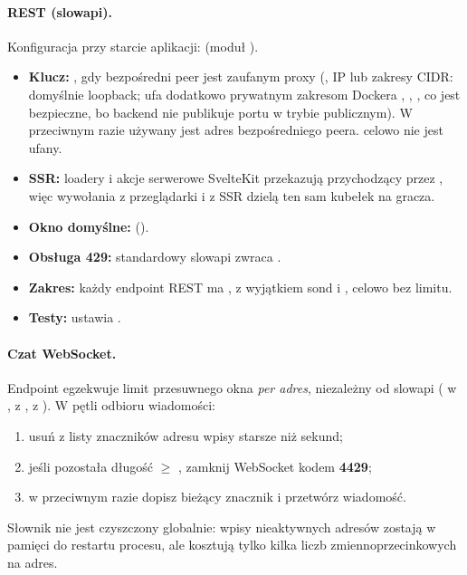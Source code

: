 \paragraph{REST (slowapi).} Konfiguracja przy starcie aplikacji:
 (moduł ).
\begin{itemize}
  \item \textbf{Klucz:} , gdy bezpośredni peer jest zaufanym proxy
        (, IP lub zakresy CIDR: domyślnie loopback;
         ufa dodatkowo prywatnym zakresom Dockera
        , , , co jest bezpieczne,
        bo backend nie publikuje portu w trybie publicznym). W przeciwnym razie używany
        jest adres bezpośredniego peera.  celowo nie jest ufany.
  \item \textbf{SSR:} loadery i akcje serwerowe SvelteKit przekazują przychodzący
         przez , więc wywołania z przeglądarki i
        z SSR dzielą ten sam kubełek na gracza.
  \item \textbf{Okno domyślne:}  ().
  \item \textbf{Obsługa 429:} standardowy  slowapi
        zwraca .
  \item \textbf{Zakres:} każdy endpoint REST ma ,
        z wyjątkiem sond  i , celowo bez limitu.
  \item \textbf{Testy:}  ustawia .
\end{itemize}

\paragraph{Czat WebSocket.} Endpoint  egzekwuje limit
przesuwnego okna \emph{per adres}, niezależny od slowapi ( w
,  z ,  z
). W pętli odbioru wiadomości:
\begin{enumerate}
  \item usuń z listy znaczników adresu wpisy starsze niż  sekund;
  \item jeśli pozostała długość $\geq$ , zamknij WebSocket kodem \textbf{4429};
  \item w przeciwnym razie dopisz bieżący znacznik i przetwórz wiadomość.
\end{enumerate}
Słownik  nie jest czyszczony globalnie: wpisy nieaktywnych adresów
zostają w pamięci do restartu procesu, ale kosztują tylko kilka liczb zmiennoprzecinkowych
na adres.

